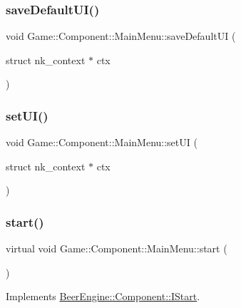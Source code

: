 \subsubsection{\texorpdfstring{save\+Default\+U\+I()}{saveDefaultUI()}}
{\footnotesize\ttfamily void Game\+::\+Component\+::\+Main\+Menu\+::save\+Default\+UI (\begin{DoxyParamCaption}\item[{struct nk\+\_\+context $\ast$}]{ctx }\end{DoxyParamCaption})}

\mbox{\label{class_game_1_1_component_1_1_main_menu_a48c58d26af82bc24b8930b18f56fdc2f}} 
\subsubsection{\texorpdfstring{set\+U\+I()}{setUI()}}
{\footnotesize\ttfamily void Game\+::\+Component\+::\+Main\+Menu\+::set\+UI (\begin{DoxyParamCaption}\item[{struct nk\+\_\+context $\ast$}]{ctx }\end{DoxyParamCaption})}

\mbox{\label{class_game_1_1_component_1_1_main_menu_a9043ca6c0ead0ef5fc048ac84171b597}} 
\subsubsection{\texorpdfstring{start()}{start()}}
{\footnotesize\ttfamily virtual void Game\+::\+Component\+::\+Main\+Menu\+::start (\begin{DoxyParamCaption}{ }\end{DoxyParamCaption})\hspace{0.3cm}{\ttfamily [virtual]}}



Implements \mbox{\hyperlink{class_beer_engine_1_1_component_1_1_i_start_aa3e25e86e20c46cdaefc6f6d7f21e495}{Beer\+Engine\+::\+Component\+::\+I\+Start}}.

